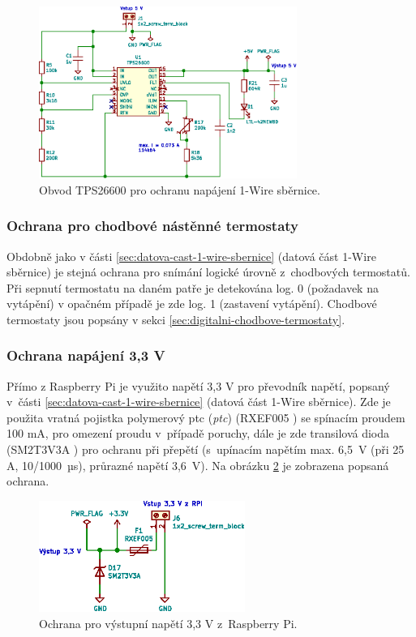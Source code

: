 \begin{figure}[H]
    \centering
    \includegraphics[width=0.75\textwidth]{images/svg/kicad/ochrana-napajeni-1-wire.eps}
    \caption{Obvod TPS26600 pro ochranu napájení 1-Wire sběrnice.}
    \label{fig:ochrana-napajeni-1-wire}
\end{figure}

\subsubsection{Ochrana pro chodbové nástěnné termostaty}
Obdobně jako v části \ref{sec:datova-cast-1-wire-sbernice} (datová část 1-Wire sběrnice) je stejná ochrana pro snímání logické úrovně z~chodbových termostatů. Při sepnutí termostatu na daném patře je detekována log. 0 (požadavek na vytápění) v opačném případě je zde log. 1 (zastavení vytápění). Chodbové  termostaty jsou popsány v sekci \ref{sec:digitalni-chodbove-termostaty}.

\subsubsection{Ochrana napájení 3,3 V}
Přímo z Raspberry Pi je využito napětí 3,3 V pro převodník napětí, popsaný v~části \ref{sec:datova-cast-1-wire-sbernice} (datová část 1-Wire sběrnice). Zde je použita vratná pojistka polymerový \acrshort{ptc} (\textit{\acrlong{ptc}}) (RXEF005 \cite{rxef005}) se spínacím proudem 100 mA, pro omezení proudu v~případě poruchy, dále je zde transilová dioda (SM2T3V3A \cite{sm2t3v3a}) pro ochranu při přepětí (s~upínacím napětím max. 6,5~V (při 25 A, 10/1000~µs), průrazné napětí 3,6~V). Na obrázku \ref{fig:ochrana-napajeni-3_3-v} je zobrazena popsaná ochrana.

\begin{figure}[H]
    \centering
    \includegraphics[width=0.6\textwidth]{images/svg/kicad/ochrana-napajeni-3_3-v.eps}
    \caption{Ochrana pro výstupní napětí 3,3 V z~Raspberry Pi.}
    \label{fig:ochrana-napajeni-3_3-v}
\end{figure}


